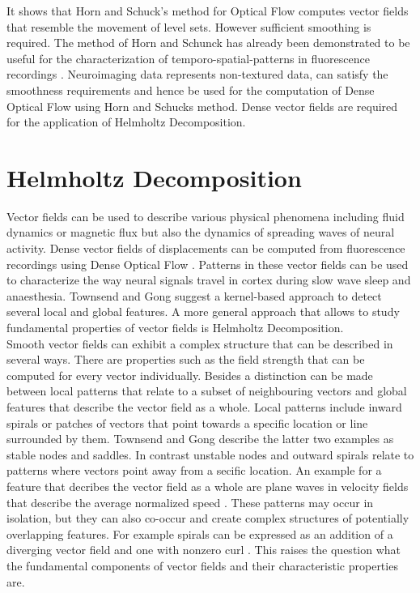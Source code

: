 It shows that Horn and Schuck’s method for Optical Flow computes vector fields that resemble the movement of level sets. However sufficient smoothing is required. The method of Horn and Schunck \parencite*{ horn1981determining} has already been demonstrated to be useful for the characterization of temporo-spatial-patterns in fluorescence recordings \parencite{townsend2018detection}. Neuroimaging data represents non-textured data, can satisfy the smoothness requirements and hence be used for the computation of Dense Optical Flow using Horn and Schucks method. Dense vector fields are required for the application of Helmholtz Decomposition.
\section{Helmholtz Decomposition}
Vector fields can be used to describe various physical phenomena including fluid dynamics or magnetic flux but also the dynamics of spreading waves of neural activity. Dense vector fields of displacements can be computed from fluorescence recordings using Dense Optical Flow \parencite{townsend2018detection}. Patterns in these vector fields can be used to characterize the way neural signals travel in cortex during slow wave sleep and anaesthesia. Townsend and Gong \parencite*{townsend2018detection} suggest a kernel-based approach to detect several local and global features. A more general approach that allows to study fundamental properties of vector fields is Helmholtz Decomposition. \\
Smooth vector fields can exhibit a complex structure that can be described in several ways. There are properties such as the field strength that can be computed for every vector individually. Besides a distinction can be made between local patterns that relate to a subset of neighbouring vectors and global features that describe the vector field as a whole. Local patterns include inward spirals or patches of vectors that point towards a specific location or line surrounded by them. Townsend and Gong \parencite*{townsend2018detection} describe the latter two examples as stable nodes and saddles. In contrast unstable nodes and outward spirals relate to patterns where vectors point away from a secific location. An example for a feature that decribes the vector field as a whole are plane waves in velocity fields that describe the average normalized speed \parencite{townsend2018detection}. These patterns may occur in isolation, but they can also co-occur and create complex structures of potentially overlapping features. For example spirals can be expressed as an addition of a diverging vector field and one with nonzero curl \parencite{cedmav2020natural}. This raises the question what the fundamental components of vector fields and their characteristic properties are.\\
